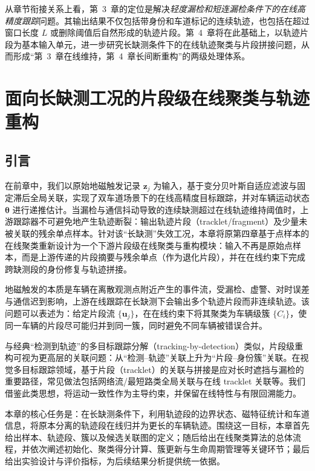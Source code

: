 \documentclass{xdupgthesis}
\begin{document}
从章节衔接关系上看，第~3~章的定位是解决\emph{轻度漏检和短连漏检条件下的在线高精度跟踪}问题。其输出结果不仅包括带身份和车道标记的连续轨迹，也包括在超过窗口长度 $L$ 或删除阈值后自然形成的轨迹片段。第~4~章将在此基础上，以轨迹片段为基本输入单元，进一步研究长缺测条件下的在线轨迹聚类与片段拼接问题，从而形成“第~3~章在线维持，第~4~章长间断重构”的两级处理体系。






\chapter{面向长缺测工况的片段级在线聚类与轨迹重构}
\label{chap:cedas_fragment}

\section*{引言}
在前章中，我们以原始地磁触发记录 $\mathbf{z}_j$ 为输入，基于变分贝叶斯自适应滤波与固定滞后全局关联，实现了双车道场景下的在线高精度目标跟踪，并对车辆运动状态 $\boldsymbol{\theta}$ 进行递推估计。当漏检与通信抖动导致的连续缺测超过在线轨迹维持阈值时，上游跟踪器不可避免地产生轨迹断裂：输出轨迹片段（tracklet/fragment）及少量未被关联的残余单点样本。针对该“长缺测”失效工况，本章将原第四章基于点样本的在线聚类重新设计为一个下游片段级在线聚类与重构模块：输入不再是原始点样本，而是上游传递的片段摘要与残余单点（作为退化片段），并在在线约束下完成跨缺测段的身份修复与轨迹拼接。

地磁触发的本质是车辆在离散观测点附近产生的事件流，受漏检、虚警、对时误差与通信迟到影响，上游在线跟踪在长缺测下会输出多个轨迹片段而非连续轨迹。该问题可以表述为：给定片段流 $\{\mathbf{u}_j\}$，在在线约束下将其聚类为车辆级簇 $\{C_i\}$，使同一车辆的片段尽可能归并到同一簇，同时避免不同车辆被错误合并。

与经典“检测到轨迹”的多目标跟踪分解（tracking-by-detection）类似，片段级重构可视为更高层的关联问题：从“检测--轨迹”关联上升为“片段--身份簇”关联。在视觉多目标跟踪领域，基于片段（tracklet）的关联与拼接是应对长时遮挡与漏检的重要路径，常见做法包括网络流/最短路类全局关联与在线 tracklet 关联等。我们借鉴此类思想，将运动一致性作为主导约束，并保留在线特性与有限回溯能力。

本章的核心任务是：在长缺测条件下，利用轨迹段的边界状态、磁特征统计和车道信息，将原本分离的轨迹段在线归并为更长的车辆轨迹。围绕这一目标，本章首先给出样本、轨迹段、簇以及候选关联图的定义；随后给出在线聚类算法的总体流程，并依次阐述初始化、聚类得分计算、簇更新与生命周期管理等关键环节；最后给出实验设计与评价指标，为后续结果分析提供统一依据。
\end{document}
